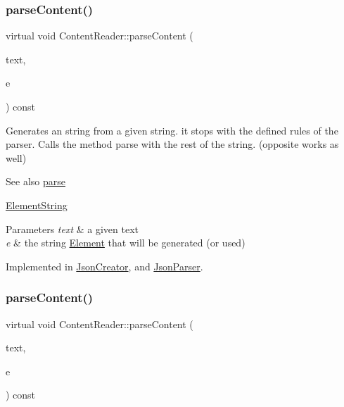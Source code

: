 \subsubsection{\texorpdfstring{parse\+Content()}{parseContent()}\hspace{0.1cm}{\footnotesize\ttfamily [2/6]}}
{\footnotesize\ttfamily virtual void Content\+Reader\+::parse\+Content (\begin{DoxyParamCaption}\item[{std\+::string \&}]{text,  }\item[{\mbox{\hyperlink{classElementString}{Element\+String}} $\ast$}]{e }\end{DoxyParamCaption}) const\hspace{0.3cm}{\ttfamily [pure virtual]}}

Generates an string from a given string. it stops with the defined rules of the parser. Calls the method parse with the rest of the string. (opposite works as well) \begin{DoxySeeAlso}{See also}
\mbox{\hyperlink{classContentReader_a7fff2e63a2e8fa216665604f69974e1d}{parse}} 

\mbox{\hyperlink{classElementString}{Element\+String}}
\end{DoxySeeAlso}

\begin{DoxyParams}{Parameters}
{\em text} & a given text \\
\hline
{\em e} & the string \mbox{\hyperlink{classElement}{Element}} that will be generated (or used) \\
\hline
\end{DoxyParams}


Implemented in \mbox{\hyperlink{classJsonCreator_acf8d7cd3dcbb669fd9eb5dec95e069f3}{Json\+Creator}}, and \mbox{\hyperlink{classJsonParser_a94737a7518f05e4ed43a753f4148b354}{Json\+Parser}}.

\mbox{\label{classContentReader_a3ee0aec579c723f17742e10fe7c75e39}} 
\subsubsection{\texorpdfstring{parse\+Content()}{parseContent()}\hspace{0.1cm}{\footnotesize\ttfamily [3/6]}}
{\footnotesize\ttfamily virtual void Content\+Reader\+::parse\+Content (\begin{DoxyParamCaption}\item[{std\+::string \&}]{text,  }\item[{\mbox{\hyperlink{classElementBoolean}{Element\+Boolean}} $\ast$}]{e }\end{DoxyParamCaption}) const\hspace{0.3cm}{\ttfamily [pure virtual]}}

